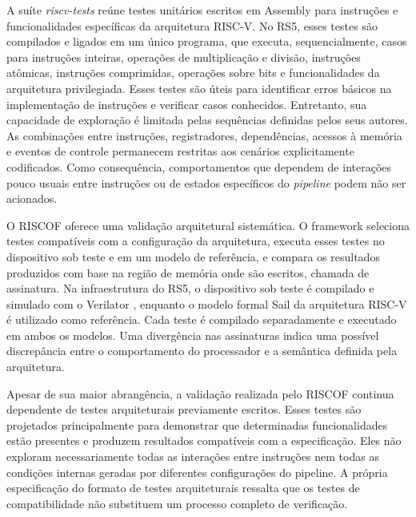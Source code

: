 A suíte \textit{riscv-tests} reúne testes unitários escritos em Assembly para instruções e funcionalidades específicas da arquitetura RISC-V. 
No RS5, esses testes são compilados e ligados em um único programa, que executa, sequencialmente, casos para instruções inteiras, operações de multiplicação e divisão, instruções atômicas, instruções comprimidas, operações sobre bits e funcionalidades da arquitetura privilegiada.
Esses testes são úteis para identificar erros básicos na implementação de instruções e verificar casos conhecidos. 
Entretanto, sua capacidade de exploração é limitada pelas sequências definidas pelos seus autores. 
As combinações entre instruções, registradores, dependências, acessos à memória e eventos de controle permanecem restritas aos cenários explicitamente codificados. 
Como consequência, comportamentos que dependem de interações pouco usuais entre instruções ou de estados específicos do \textit{pipeline} podem não ser acionados.

O RISCOF oferece uma validação arquitetural sistemática. 
O framework seleciona testes compatíveis com a configuração da arquitetura, executa esses testes no dispositivo sob teste e em um modelo de referência, e compara os resultados produzidos com base na região de memória onde são escritos, chamada de assinatura. 
Na infraestrutura do RS5, o dispositivo sob teste é compilado e simulado com o Verilator \citep{Snyder:2026:Verilator}, enquanto o modelo formal Sail \citep{Armstrong:2019:Sail} da arquitetura RISC-V é utilizado como referência. 
Cada teste é compilado separadamente e executado em ambos os modelos. 
Uma divergência nas assinaturas indica uma possível discrepância entre o comportamento do processador e a semântica definida pela arquitetura.

Apesar de sua maior abrangência, a validação realizada pelo RISCOF continua dependente de testes arquiteturais previamente escritos. 
Esses testes são projetados principalmente para demonstrar que determinadas funcionalidades estão presentes e produzem resultados compatíveis com a especificação. 
Eles não exploram necessariamente todas as interações entre instruções nem todas as condições internas geradas por diferentes configurações do pipeline. 
A própria especificação do formato de testes arquiteturais ressalta que os testes de compatibilidade não substituem um processo completo de verificação.

